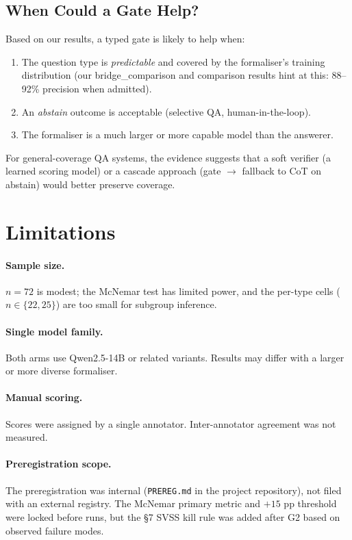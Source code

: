 \documentclass[11pt]{article}
\newcommand{\mcnem}{McNemar}
\begin{document}
\subsection{When Could a Gate Help?}

Based on our results, a typed gate is likely to help when:
\begin{enumerate}[leftmargin=*,noitemsep]
  \item The question type is \emph{predictable} and covered by the formaliser's
    training distribution (our bridge\_comparison and comparison results hint at
    this: 88--92\% precision when admitted).
  \item An \emph{abstain} outcome is acceptable (selective QA, human-in-the-loop).
  \item The formaliser is a much larger or more capable model than the answerer.
\end{enumerate}

For general-coverage QA systems, the evidence suggests that a soft verifier
(a learned scoring model) or a cascade approach
(gate $\rightarrow$ fallback to CoT on abstain) would better preserve coverage.

\section{Limitations}
\label{sec:limitations}

\paragraph{Sample size.}  $n{=}72$ is modest; the \mcnem{} test has limited
power, and the per-type cells ($n \in \{22, 25\}$) are too small for
subgroup inference.

\paragraph{Single model family.}  Both arms use Qwen2.5-14B or related
variants.  Results may differ with a larger or more diverse formaliser.

\paragraph{Manual scoring.}  Scores were assigned by a single annotator.
Inter-annotator agreement was not measured.

\paragraph{Preregistration scope.}  The preregistration was internal
(\texttt{PREREG.md} in the project repository), not filed with an external
registry.  The \mcnem{} primary metric and $+15$ pp threshold were locked
before runs, but the §7 SVSS kill rule was added after G2 based on
observed failure modes.
\end{document}
